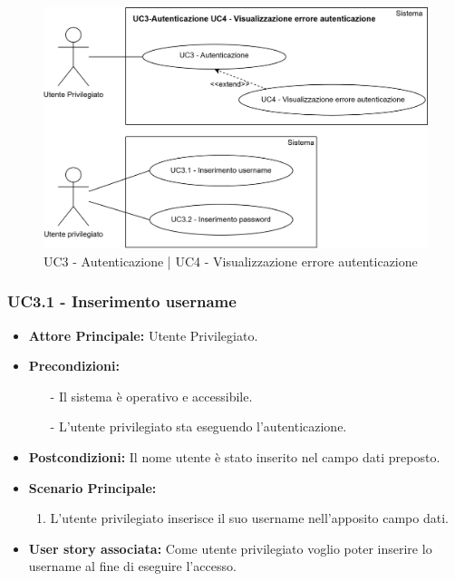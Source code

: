 \documentclass[11pt]{article}
\begin{document}
\begin{justify}
\begin{figure}[ht]
    \centering
    \includegraphics[width=0.5\linewidth]{UC3-UC4image.png}
    \caption{UC3 - Autenticazione | UC4 - Visualizzazione errore autenticazione}
    \label{fig:UC3 e UC4}
\end{figure}

\subsubsection{\textbf{UC3.1 - Inserimento username}}
\begin{itemize}
     \item \textbf{Attore Principale:} Utente Privilegiato.
     \item \textbf{Precondizioni:} 
            \begin{itemize}
                \item [-] Il sistema è operativo e accessibile.
                \item [-] L'utente privilegiato sta eseguendo l'autenticazione.
            \end{itemize}
     \item \textbf{Postcondizioni:} Il nome utente è stato inserito nel campo dati preposto.
     \item \textbf{Scenario Principale:}
     \begin{enumerate}
         \item L'utente privilegiato inserisce il suo username nell'apposito campo dati.
     \end{enumerate}
     \item \textbf{User story associata:} Come utente privilegiato voglio poter inserire lo username al fine di 
     eseguire l'accesso.
\end{itemize}


\end{justify}
\end{document}
